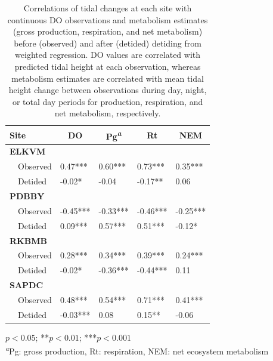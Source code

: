 \documentclass[letterpaper,12pt,oneside]{article}\usepackage[]{graphicx}\usepackage[]{color}
\begin{document}
%
\begin{table}[!tbp]
\caption{Correlations of tidal changes at each site with continuous \ac{DO} observations and metabolism estimates (gross production, respiration, and net metabolism) before (observed) and after (detided) detiding from weighted regression.  \ac{DO} values are correlated with predicted tidal height at each observation, whereas metabolism estimates are correlated with mean tidal height change between observations during day, night, or total day periods for production, respiration, and net metabolism, respectively.\label{tab:cor_res}} 
\begin{center}
\begin{tabular}{lllll}
\hline\hline
\multicolumn{1}{l}{Site}&\multicolumn{1}{c}{DO}&\multicolumn{1}{c}{Pg\textsuperscript{\textit{a}}}&\multicolumn{1}{c}{Rt}&\multicolumn{1}{c}{NEM}\tabularnewline
\hline
{\bfseries ELKVM}&&&&\tabularnewline
~~Observed& 0.47***& 0.60***& 0.73***& 0.35***\tabularnewline
~~Detided&-0.02*&-0.04 &-0.17**& 0.06 \tabularnewline
\hline
{\bfseries PDBBY}&&&&\tabularnewline
~~Observed&-0.45***&-0.33***&-0.46***&-0.25***\tabularnewline
~~Detided& 0.09***& 0.57***& 0.51***&-0.12*\tabularnewline
\hline
{\bfseries RKBMB}&&&&\tabularnewline
~~Observed& 0.28***& 0.34***& 0.39***& 0.24***\tabularnewline
~~Detided&-0.02*&-0.36***&-0.44***& 0.11 \tabularnewline
\hline
{\bfseries SAPDC}&&&&\tabularnewline
~~Observed& 0.48***& 0.54***& 0.71***& 0.41***\tabularnewline
~~Detided&-0.03***& 0.08 & 0.15**&-0.06 \tabularnewline
\hline
\end{tabular}
\end{center}
\footnotesize *$p<0.05$; **$p<0.01$; ***$p<0.001$\\\textsuperscript{\textit{a}}Pg: gross production, Rt: respiration, NEM: net ecosystem metabolism\end{table}
\end{document}
